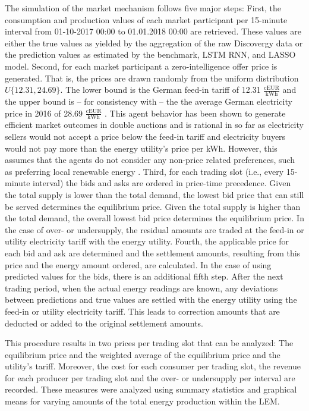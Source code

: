 The simulation of the market mechanism follows five major steps: First, the consumption and production values of each market participant per 15-minute interval from 01-10-2017 00:00 to 01.01.2018 00:00 are retrieved. These values are either the true values as yielded by the aggregation of the raw Discovergy data or the prediction values as estimated by the benchmark, LSTM RNN, and LASSO model. Second, for each market participant a zero-intelligence offer price is generated. That is, the prices are drawn randomly from the uniform distribution $\textit{U}\{12.31,24.69\}$. The lower bound is the German feed-in tariff of 12.31 $\frac{\text{cEUR}}{\text{kWh}}$ and the upper bound is -- for consistency with \citet{Mengelkamp:2018a} -- the the average German electricity price in 2016 of 28.69 $\frac{\text{cEUR}}{\text{kWh}}$ \citep{Heidjann:2017}. This agent behavior has been shown to generate efficient market outcomes in double auctions \citep{Gode:1993} and is rational in so far as electricity sellers would not accept a price below the feed-in tariff and electricity buyers would not pay more than the energy utility's price per kWh. However, this assumes that the agents do not consider any non-price related preferences, such as preferring local renewable energy \citep{Mengelkamp:2018a}. Third, for each trading slot (i.e., every 15-minute interval) the bids and asks are ordered in price-time precedence. Given the total supply is lower than the total demand, the lowest bid price that can still be served determines the equilibrium price. Given the total supply is higher than the total demand, the overall lowest bid price determines the equilibrium price. In the case of over- or undersupply, the residual amounts are traded at the feed-in or utility electricity tariff with the energy utility. Fourth, the applicable price for each bid and ask are determined and the settlement amounts, resulting from this price and the energy amount ordered, are calculated. In the case of using predicted values for the bids, there is an additional fifth step. After the next trading period, when the actual energy readings are known, any deviations between predictions and true values are settled with the energy utility using the feed-in or utility electricity tariff. This leads to correction amounts that are deducted or added to the original settlement amounts.

This procedure results in two prices per trading slot that can be analyzed: The equilibrium price and the weighted average of the equilibrium price and the utility's tariff. Moreover, the cost for each consumer per trading slot, the revenue for each producer per trading slot and the over- or undersupply per interval are recorded. These measures were analyzed using summary statistics and graphical means for varying amounts of the total energy production within the LEM.


